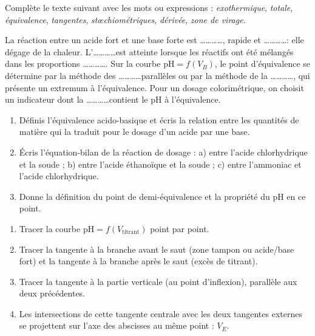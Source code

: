 \documentclass[11pt]{article}
\newcommand{\cle}[1]{{\popxbold\color{popdark}#1}}
\newcounter{popsec}
\newcounter{popsub}
\newcommand{\courssub}[1]{%
  \stepcounter{popsub}%
  \par\vspace{9pt}\noindent{\popxbold\fontsize{11.5}{13}\selectfont\color{popink}{\color{poporange}\thepopsec.\thepopsub}\hspace{6pt}#1}\par\nopagebreak\vspace{4pt}
}
\begin{document}
\begin{exercice}
Complète le texte suivant avec les mots ou expressions : \emph{exothermique}, \emph{totale}, \emph{équivalence}, \emph{tangentes}, \emph{stœchiométriques}, \emph{dérivée}, \emph{zone de virage}.

La réaction entre un acide fort et une base forte est \ldots\ldots\ldots\ldots, rapide et \ldots\ldots\ldots\ldots : elle dégage de la chaleur. L'\ldots\ldots\ldots\ldots est atteinte lorsque les réactifs ont été mélangés dans les proportions \ldots\ldots\ldots\ldots. Sur la courbe $\mathrm{pH} = f(V_B)$, le point d'équivalence se détermine par la méthode des \ldots\ldots\ldots\ldots parallèles ou par la méthode de la \ldots\ldots\ldots\ldots, qui présente un extremum à l'équivalence. Pour un dosage colorimétrique, on choisit un indicateur dont la \ldots\ldots\ldots\ldots contient le pH à l'équivalence.
\end{exercice}

\begin{exercice}
\begin{enumerate}
\item Définis l'\cle{équivalence acido-basique} et écris la relation entre les quantités de matière qui la traduit pour le dosage d'un acide par une base.
\item Écris l'équation-bilan de la réaction de dosage : a) entre l'acide chlorhydrique et la soude ; b) entre l'acide éthanoïque et la soude ; c) entre l'ammoniac et l'acide chlorhydrique.
\item Donne la définition du \cle{point de demi-équivalence} et la propriété du pH en ce point.
\end{enumerate}
\end{exercice}

\courssub{Je m'entraîne}

\begin{methode}
\begin{enumerate}
\item Tracer la courbe $\mathrm{pH} = f(V_{\text{titrant}})$ point par point.
\item Tracer la tangente à la branche avant le saut (zone tampon ou acide/base fort) et la tangente à la branche après le saut (excès de titrant).
\item Tracer la tangente à la partie verticale (au point d'inflexion), parallèle aux deux précédentes.
\item Les intersections de cette tangente centrale avec les deux tangentes externes se projettent sur l'axe des abscisses au même point : $V_E$.
\end{enumerate}
\end{methode}
\end{document}
